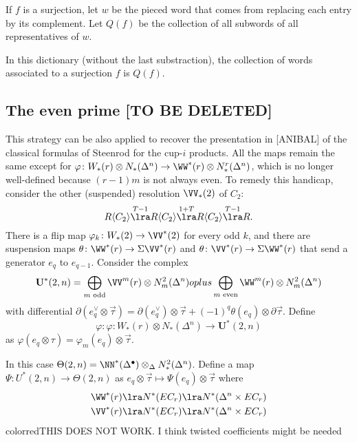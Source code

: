If $f$ is a surjection, let $w$ be the pieced word that comes from replacing each entry by its complement. Let $Q(f)$ be the collection of all subwords of all representatives of $w$.
\begin{lemma} In this dictionary (without the last substraction), the collection of words associated to a surjection $f$ is $Q(f)$.
\end{lemma}

\subsection{The even prime [TO BE DELETED]} This strategy can be also applied to recover the presentation in [ANIBAL] of the classical formulas of Steenrod for the cup-$i$ products. All the maps remain the same except for $\varphi\colon W_*(r)\otimes N_*(\Delta^n)\to \WW^*(r)\otimes N^r_*(\Delta^n)$, which is no longer well-defined because $(r-1)m$ is not always even. To remedy this handicap, consider the other (suspended) resolution $\VV_*(2)$ of $C_2$:
\[R\langle C_2\rangle \overset{T-1}{\lra} R\langle C_2\rangle \overset{1+T}{\lra} R\langle C_2\rangle \overset{T-1}{\lra} R.\]
There is a flip map $\varphi_k\colon W_*(2)\to \VV^*(2)$ for every odd $k$, and there are suspension maps $\theta\colon \WW^*(r)\to \Sigma \VV^*(r)$ and $\theta\colon \VV^*(r)\to \Sigma \WW^*(r)$ that send a generator $e_q$ to $e_{q-1}$. Consider the complex
\[\mathbf{U}^*(2,n) = \bigoplus_{m\text{ odd}} \VV^m(r)\otimes N^2_m(\Delta^n)
oplus
\bigoplus_{m\text{ even}} \WW^m(r)\otimes N^2_m(\Delta^n)
\]
with differential $\partial(e_q^\vee\otimes \vec{\tau}) = \partial(e_q^\vee)\otimes \vec{\tau} + (-1)^q \theta(e_q)\otimes \partial \vec{\tau}$. Define
\[\varphi\colon \varphi\colon W_*(r)\otimes N_*(\Delta^n)\to
\mathbf{U}^*(2,n)\]
as $\varphi(e_q\otimes \tau) = \varphi_m(e_q)\otimes \vec{\tau}$.

In this case $\Theta(2,n) = \NN^*(\Delta^\bullet)\otimes_{\Delta} N_*^2(\Delta^n)$. Define a map $\Psi\colon U^*(2,n)\to \Theta(2,n)$ as $e_q\otimes \vec{\tau}\mapsto \Psi(e_q)\otimes \vec{\tau}$ where
\begin{align*}
	\WW^*(r)\lra N^*(EC_r) \lra N^*(\Delta^n\times EC_r) \\
	\VV^*(r)\lra N^*(EC_r) \lra N^*(\Delta^n\times EC_r) \\
\end{align*}
{color{red}THIS DOES NOT WORK. I think twisted coefficients might be needed}